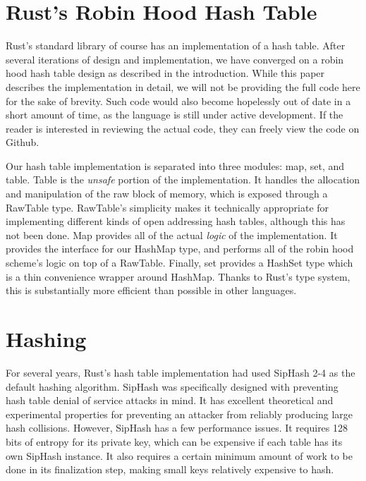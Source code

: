 \documentclass{cccg13}
\begin{document}
\section{Rust's Robin Hood Hash Table}

Rust's standard library of course has an implementation of a hash table. After several iterations of design and implementation, we have converged on a robin hood hash table design as described in the introduction. While this paper describes the implementation in detail, we will not be providing the full code here for the sake of brevity. Such code would also become hopelessly out of date in a short amount of time, as the language is still under active development. If the reader is interested in reviewing the actual code, they can freely view the code on Github. \cite{rust-source}

Our hash table implementation is separated into three modules: map, set, and table. Table is the \emph{unsafe} portion of the implementation. It handles the allocation and manipulation of the raw block of memory, which is exposed through a RawTable type. RawTable's simplicity makes it technically appropriate for implementing different kinds of open addressing hash tables, although this has not been done. Map provides all of the actual \emph{logic} of the implementation. It provides the interface for our HashMap type, and performs all of the robin hood scheme's logic on top of a RawTable. Finally, set provides a HashSet type which is a thin convenience wrapper around HashMap. Thanks to Rust's type system, this is substantially more efficient than possible in other languages.





\section{Hashing}
For several years, Rust's hash table implementation had used SipHash 2-4 \cite{siphash} as the default hashing algorithm. SipHash was specifically designed with preventing hash table denial of service attacks in mind. It has excellent theoretical and experimental properties for preventing an attacker from reliably producing large hash collisions. However, SipHash has a few performance issues. It requires 128 bits of entropy for its private key, which can be expensive if each table has its own SipHash instance. It also requires a certain minimum amount of work to be done in its finalization step, making small keys relatively expensive to hash.
\end{document}
